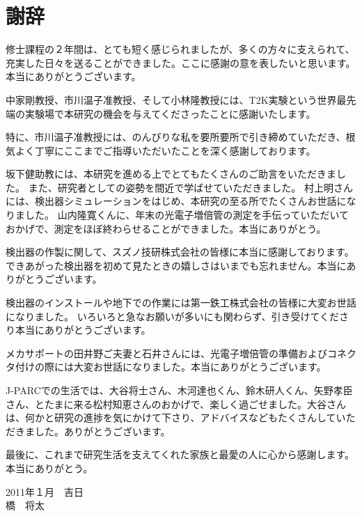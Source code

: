 \documentclass[11pt]{jreport}
\begin{document}
\chapter*{謝辞}

修士課程の２年間は、とても短く感じられましたが、多くの方々に支えられて、充実した日々を送ることができました。ここに感謝の意を表したいと思います。本当にありがとうございます。

中家剛教授、市川温子准教授、そして小林隆教授には、T2K実験という世界最先端の実験場で本研究の機会を与えてくださったことに感謝いたします。

特に、市川温子准教授には、のんびりな私を要所要所で引き締めていただき、根気よく丁寧にここまでご指導いただいたことを深く感謝しております。

坂下健助教には、本研究を進める上でとてもたくさんのご助言をいただきました。
また、研究者としての姿勢を間近で学ばせていただきました。
村上明さんには、検出器シミュレーションをはじめ、本研究の至る所でたくさんお世話になりました。
山内隆寛くんに、年末の光電子増倍管の測定を手伝っていただいておかげで、測定をほぼ終わらせることができました。本当にありがとう。

検出器の作製に関して、スズノ技研株式会社の皆様に本当に感謝しております。できあがった検出器を初めて見たときの嬉しさはいまでも忘れません。本当にありがとうございます。

検出器のインストールや地下での作業には第一鉄工株式会社の皆様に大変お世話になりました。
いろいろと急なお願いが多いにも関わらず、引き受けてくださり本当にありがとうございます。

メカサポートの田井野ご夫妻と石井さんには、光電子増倍管の準備およびコネクタ付けの際には大変お世話になりました。本当にありがとうございます。


J-PARCでの生活では、大谷将士さん、木河達也くん、鈴木研人くん、矢野孝臣さん、とたまに来る松村知恵さんのおかげで、楽しく過ごせました。大谷さんは、何かと研究の進捗を気にかけて下さり、アドバイスなどもたくさんしていただきました。ありがとうございます。\newline

最後に、これまで研究生活を支えてくれた家族と最愛の人に心から感謝します。本当にありがとう。\newline
\begin{flushright}
2011年１月　吉日\\
橋　将太
\end{flushright}




%
\end{document}
